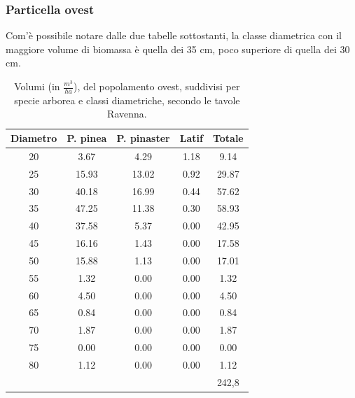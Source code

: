 \subsubsection*{Particella ovest}
Com'è possibile notare dalle due tabelle sottostanti, la classe diametrica con il maggiore volume di biomassa è quella dei 35 cm, poco superiore di quella dei 30 cm.
\begin{table}[H]
\caption{Volumi (in $\frac{m^3}{ha}$), del popolamento ovest, suddivisi per specie arborea e classi diametriche, secondo le tavole Ravenna.}
\centering
\begin{tabular}{ccccc}
\toprule
Diametro & P. pinea & P. pinaster & Latif & Totale \\
\midrule
20       & 3.67    & 4.29       & 1.18  & 9.14   \\
25       & 15.93   & 13.02      & 0.92  & 29.87  \\
30       & 40.18   & 16.99      & 0.44  & 57.62  \\
35       & 47.25   & 11.38      & 0.30  & 58.93  \\
40       & 37.58   & 5.37       & 0.00  & 42.95  \\
45       & 16.16   & 1.43       & 0.00  & 17.58  \\
50       & 15.88   & 1.13       & 0.00  & 17.01  \\
55       & 1.32    & 0.00       & 0.00  & 1.32   \\
60       & 4.50    & 0.00       & 0.00  & 4.50   \\
65       & 0.84    & 0.00       & 0.00  & 0.84   \\
70       & 1.87    & 0.00       & 0.00  & 1.87   \\
75       & 0.00    & 0.00       & 0.00  & 0.00   \\
80       & 1.12    & 0.00       & 0.00  & 1.12   \\
\midrule
&&&&  242,8\\
\bottomrule
\end{tabular}
\label{tab:volumi_ravenna_ettaro_ovest}
\end{table}

